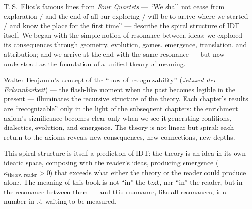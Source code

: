 \begin{interpretation}
\label{interp:ch22:epilogue_eliot_benjamin}
T.\,S.\ Eliot's famous lines from \textit{Four Quartets} ---
``We shall not cease from exploration / and the end of all our exploring /
will be to arrive where we started / and know the place for the first
time'' --- describe the spiral structure of IDT itself.  We began with
the simple notion of resonance between ideas; we explored its consequences
through geometry, evolution, games, emergence, translation, and
attribution; and we arrive at the end with the same resonance ---
but now understood as the foundation of a unified theory of meaning.

Walter Benjamin's concept of the ``now of recognizability''
(\textit{Jetzzeit der Erkennbarkeit}) --- the flash-like moment when the
past becomes legible in the present --- illuminates the recursive
structure of the theory.  Each chapter's results are ``recognizable'' only
in the light of the subsequent chapters: the enrichment axiom's
significance becomes clear only when we see it generating coalitions,
dialectics, evolution, and emergence.  The theory is not linear but
spiral: each return to the axioms reveals new consequences, new
connections, new depths.

This spiral structure is itself a prediction of IDT: the theory is an
idea in its own ideatic space, composing with the reader's ideas,
producing emergence ($\kappa_{\text{theory, reader}} > 0$) that exceeds
what either the theory or the reader could produce alone.  The meaning
of this book is not ``in'' the text, nor ``in'' the reader, but in
the resonance between them --- and this resonance, like all resonances,
is a number in $\mathbb{R}$, waiting to be measured.
\end{interpretation}

